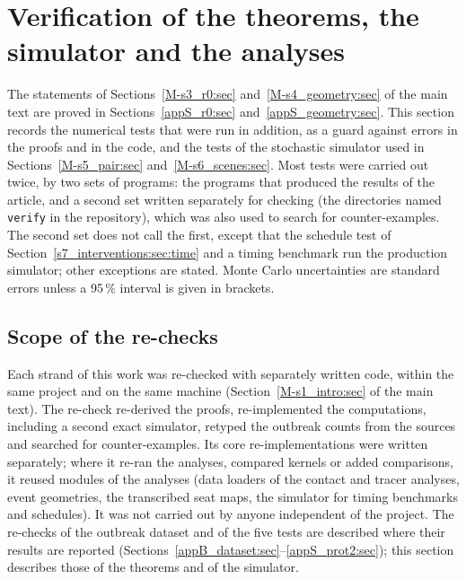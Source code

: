 \section{Verification of the theorems, the simulator and the analyses}\label{appA_numerics:sec}

The statements of Sections~\ref{M-s3_r0:sec} and~\ref{M-s4_geometry:sec} of the main text are proved in
Sections~\ref{appS_r0:sec} and~\ref{appS_geometry:sec}. This section records
the numerical tests that were run in addition, as a guard against errors in the proofs and in the code, and
the tests of the stochastic simulator used in Sections~\ref{M-s5_pair:sec} and~\ref{M-s6_scenes:sec}. Most
tests were carried out twice, by two sets of programs: the programs that produced the results of the article,
and a second set written separately for checking (the directories named \texttt{verify} in the repository),
which was also used to search for counter-examples. The second set does not call the first, except that the
schedule test of Section~\ref{s7_interventions:sec:time} and a timing benchmark run the production simulator;
other exceptions are stated. Monte Carlo uncertainties are standard
errors unless a 95\,\% interval is given in brackets.

\subsection{Scope of the re-checks}\label{appA_numerics:sec:scope}

Each strand of this work was re-checked with separately written code, within the same project and on the same
machine (Section~\ref{M-s1_intro:sec} of the main text). The re-check re-derived the proofs, re-implemented the
computations, including a second exact simulator, retyped the outbreak counts from the sources and searched for
counter-examples. Its core re-implementations were written separately; where it re-ran the analyses, compared
kernels or added comparisons, it reused modules of the analyses (data loaders of the contact and tracer analyses,
event geometries, the transcribed seat maps, the simulator for timing benchmarks and schedules). It was not carried
out by anyone independent of the project. The re-checks of the outbreak dataset and of the five tests are described
where their results are reported (Sections~\ref{appB_dataset:sec}--\ref{appS_prot2:sec}); this section describes
those of the theorems and of the simulator.

